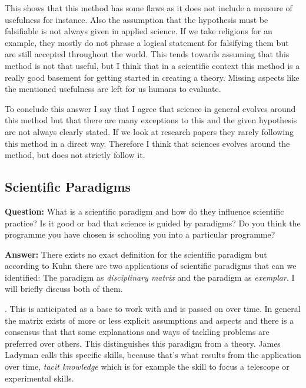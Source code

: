 \documentclass[11pt]{scrartcl}
\begin{document}
This shows that this method has some flaws as it does not include a measure of usefulness for instance. Also the assumption that the hypothesis must be falsifiable is not always given in applied science. If we take religions for an example, they mostly do not phrase a logical statement for falsifying them but are still accepted throughout the world. This tends towards assuming that  this method is not that useful, but I think that in a scientific context this method is a really good basement for getting started in creating a theory. Missing aspects like the mentioned usefulness are left for us humans to evaluate.

To conclude this answer I say that I agree that science in general evolves around this method but that there are many exceptions to this and the given hypothesis are not always clearly stated. If we look at research papers they rarely following this method in a direct way. Therefore I think that sciences evolves around the method, but does not strictly follow it.

\subsection{Scientific Paradigms}

\textbf{Question:} What is a scientific paradigm and how do they influence scientific practice? Is it good or bad that science is guided by paradigms? Do you think the programme you have chosen is schooling you into a particular programme?

\bigbreak

\textbf{Answer:} There exists no exact definition for the scientific paradigm but according to Kuhn there are two applications of scientific paradigms that can we identified: The paradigm as \textit{disciplinary matrix} and the paradigm as \textit{exemplar}. I will briefly discuss both of them.

 \cite[p. 98]{ladyman}. This is anticipated as a base to work with and is passed on over time. In general the matrix exists of more or less explicit assumptions and aspects and there is a consensus that that some explanations and ways of tackling problems are preferred over others. This distinguishes this paradigm from a theory. James Ladyman calls this specific skills, because that's what results from the application over time, \textit{tacit knowledge} which is for example the skill to focus a telescope or experimental skills.
\end{document}

